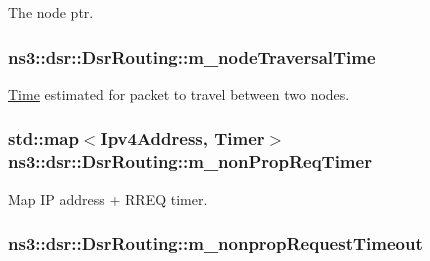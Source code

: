 The node ptr. 

\subsubsection[{\texorpdfstring{m\+\_\+node\+Traversal\+Time}{m_nodeTraversalTime}}]{ ns3\+::dsr\+::\+Dsr\+Routing\+::m\+\_\+node\+Traversal\+Time\hspace{0.3cm}{\ttfamily [private]}}\hypertarget{classns3_1_1dsr_1_1DsrRouting_a4c406057009653878e8cdf3e3a7f2106}{}\label{classns3_1_1dsr_1_1DsrRouting_a4c406057009653878e8cdf3e3a7f2106}


\hyperlink{classns3_1_1Time}{Time} estimated for packet to travel between two nodes. 

\subsubsection[{\texorpdfstring{m\+\_\+non\+Prop\+Req\+Timer}{m_nonPropReqTimer}}]{\setlength{\rightskip}{0pt plus 5cm}std\+::map$<${\bf Ipv4\+Address}, {\bf Timer}$>$ ns3\+::dsr\+::\+Dsr\+Routing\+::m\+\_\+non\+Prop\+Req\+Timer\hspace{0.3cm}{\ttfamily [private]}}\hypertarget{classns3_1_1dsr_1_1DsrRouting_a0936df610f90f7e79c24a2a8cdea6c14}{}\label{classns3_1_1dsr_1_1DsrRouting_a0936df610f90f7e79c24a2a8cdea6c14}


Map IP address + R\+R\+EQ timer. 

\subsubsection[{\texorpdfstring{m\+\_\+nonprop\+Request\+Timeout}{m_nonpropRequestTimeout}}]{ ns3\+::dsr\+::\+Dsr\+Routing\+::m\+\_\+nonprop\+Request\+Timeout\hspace{0.3cm}{\ttfamily [private]}}\hypertarget{classns3_1_1dsr_1_1DsrRouting_a42c2f43fbb0c5fefed36689eaf5c720e}{}\label{classns3_1_1dsr_1_1DsrRouting_a42c2f43fbb0c5fefed36689eaf5c720e}


